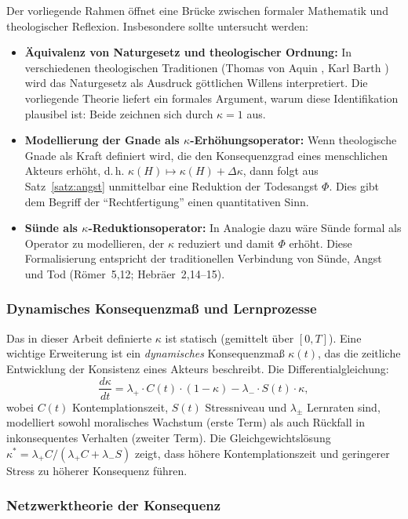 ﻿\documentclass[a4paper,12pt]{article}
\theoremstyle{definition}
\begin{document}
Der vorliegende Rahmen öffnet eine Brücke zwischen formaler Mathematik und theologischer Reflexion. Insbesondere sollte untersucht werden:
\begin{itemize}
\item \textbf{Äquivalenz von Naturgesetz und theologischer Ordnung:} In verschiedenen theologischen Traditionen (Thomas von Aquin \cite{aquin1266}, Karl Barth \cite{barth1932}) wird das Naturgesetz als Ausdruck göttlichen Willens interpretiert. Die vorliegende Theorie liefert ein formales Argument, warum diese Identifikation plausibel ist: Beide zeichnen sich durch $\kappa = 1$ aus.
\item \textbf{Modellierung der Gnade als $\kappa$-Erhöhungsoperator:} Wenn theologische Gnade als Kraft definiert wird, die den Konsequenzgrad eines menschlichen Akteurs erhöht, d.\,h. $\kappa(H) \mapsto \kappa(H) + \Delta\kappa$, dann folgt aus Satz~\ref{satz:angst} unmittelbar eine Reduktion der Todesangst $\Phi$. Dies gibt dem Begriff der ``Rechtfertigung'' einen quantitativen Sinn.
\item \textbf{Sünde als $\kappa$-Reduktionsoperator:} In Analogie dazu wäre Sünde formal als Operator zu modellieren, der $\kappa$ reduziert und damit $\Phi$ erhöht. Diese Formalisierung entspricht der traditionellen Verbindung von Sünde, Angst und Tod (Römer~5,12; Hebräer~2,14--15).
\end{itemize}

\subsubsection{Dynamisches Konsequenzmaß und Lernprozesse}

Das in dieser Arbeit definierte $\kappa$ ist statisch (gemittelt über $[0,T]$). Eine wichtige Erweiterung ist ein \emph{dynamisches} Konsequenzmaß $\kappa(t)$, das die zeitliche Entwicklung der Konsistenz eines Akteurs beschreibt. Die Differentialgleichung:
\[
\frac{d\kappa}{dt} = \lambda_+ \cdot C(t) \cdot (1 - \kappa) - \lambda_- \cdot S(t) \cdot \kappa,
\]
wobei $C(t)$ Kontemplationszeit, $S(t)$ Stressniveau und $\lambda_\pm$ Lernraten sind, modelliert sowohl moralisches Wachstum (erste Term) als auch Rückfall in inkonsequentes Verhalten (zweiter Term). Die Gleichgewichtslösung $\kappa^* = \lambda_+ C / (\lambda_+ C + \lambda_- S)$ zeigt, dass höhere Kontemplationszeit und geringerer Stress zu höherer Konsequenz führen.

\subsubsection{Netzwerktheorie der Konsequenz}
\end{document}
